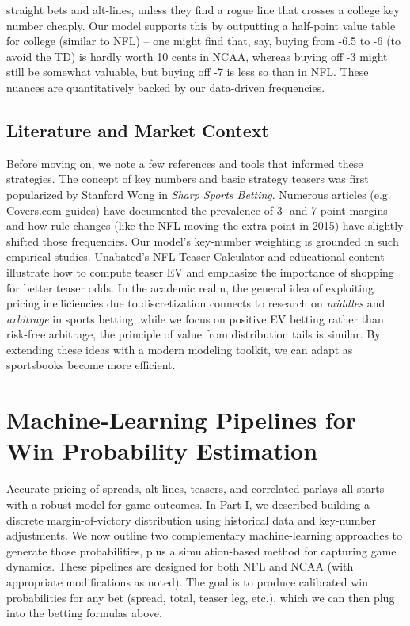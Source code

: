 \documentclass[11pt]{amsart}
\begin{document}
straight bets and alt-lines, unless they find a rogue line that crosses a college key number cheaply. Our model supports this by outputting a half-point value table for college (similar to NFL) – one might find that, say, buying from -6.5 to -6 (to avoid the TD) is hardly worth 10 cents in NCAA, whereas buying off -3 might still be somewhat valuable, but buying off -7 is less so than in NFL. These nuances are quantitatively backed by our data-driven frequencies.

\subsection*{Literature and Market Context}
Before moving on, we note a few references and tools that informed these strategies. The concept of key numbers and basic strategy teasers was first popularized by Stanford Wong in \emph{Sharp Sports Betting}. Numerous articles (e.g. Covers.com guides) have documented the prevalence of 3- and 7-point margins and how rule changes (like the NFL moving the extra point in 2015) have slightly shifted those frequencies. Our model’s key-number weighting is grounded in such empirical studies. Unabated’s NFL Teaser Calculator and educational content illustrate how to compute teaser EV and emphasize the importance of shopping for better teaser odds. In the academic realm, the general idea of exploiting pricing inefficiencies due to discretization connects to research on \textit{middles} and \textit{arbitrage} in sports betting; while we focus on positive EV betting rather than risk-free arbitrage, the principle of value from distribution tails is similar. By extending these ideas with a modern modeling toolkit, we can adapt as sportsbooks become more efficient.

\section{Machine-Learning Pipelines for Win Probability Estimation}
Accurate pricing of spreads, alt-lines, teasers, and correlated parlays all starts with a robust model for game outcomes. In Part I, we described building a discrete margin-of-victory distribution using historical data and key-number adjustments. We now outline two complementary machine-learning approaches to generate those probabilities, plus a simulation-based method for capturing game dynamics. These pipelines are designed for both NFL and NCAA (with appropriate modifications as noted). The goal is to produce calibrated win probabilities for any bet (spread, total, teaser leg, etc.), which we can then plug into the betting formulas above.
\end{document}
